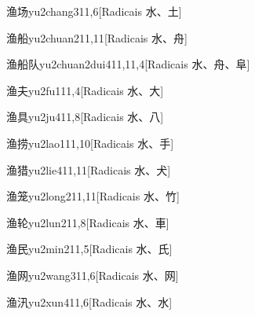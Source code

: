\begin{entry}{渔场}{yu2chang3}{11,6}[Radicais ⽔、⼟]
\end{entry}

\begin{entry}{渔船}{yu2chuan2}{11,11}[Radicais ⽔、⾈]
\end{entry}

\begin{entry}{渔船队}{yu2chuan2dui4}{11,11,4}[Radicais ⽔、⾈、⾩]
\end{entry}

\begin{entry}{渔夫}{yu2fu1}{11,4}[Radicais ⽔、⼤]
\end{entry}

\begin{entry}{渔具}{yu2ju4}{11,8}[Radicais ⽔、⼋]
\end{entry}

\begin{entry}{渔捞}{yu2lao1}{11,10}[Radicais ⽔、⼿]
\end{entry}

\begin{entry}{渔猎}{yu2lie4}{11,11}[Radicais ⽔、⽝]
\end{entry}

\begin{entry}{渔笼}{yu2long2}{11,11}[Radicais ⽔、⽵]
\end{entry}

\begin{entry}{渔轮}{yu2lun2}{11,8}[Radicais ⽔、⾞]
\end{entry}

\begin{entry}{渔民}{yu2min2}{11,5}[Radicais ⽔、⽒]
\end{entry}

\begin{entry}{渔网}{yu2wang3}{11,6}[Radicais ⽔、⽹]
\end{entry}

\begin{entry}{渔汛}{yu2xun4}{11,6}[Radicais ⽔、⽔]
\end{entry}

